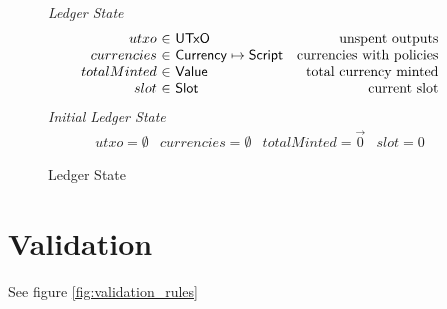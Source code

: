 \documentclass[11pt,a4paper]{article}
\newcommand{\type}[1]{\mathsf{#1}}
\newcommand{\Slot}{\type{Slot}}
\newcommand{\Script}{\type{Script}}
\newcommand{\Currency}{\type{Currency}}
\newcommand{\Value}{\type{Value}}
\newcommand{\UTxO}{\type{UTxO}}
\begin{document}
\begin{figure}

\emph{Ledger State}
%
\begin{equation*}
\begin{array}{r@{~\in~}lr}
utxo & \UTxO & \text{unspent outputs}
\\
currencies & \Currency \mapsto \Script
  & \text{currencies with policies}
\\
totalMinted & \Value & \text{total currency minted}
\\
slot & \Slot & \text{current slot}

\end{array}
\end{equation*}
%
\emph{Initial Ledger State}
%
\begin{equation*}
\begin{array}{llllll}
utxo = \emptyset
  & currencies = \emptyset
  & totalMinted = \vec{0}
  & slot = 0
\end{array}
\end{equation*}

\caption{Ledger State}
\label{fig:ledger_state}
\end{figure}

\section{Validation}
See figure \cref{fig:validation_rules} 
\end{document}
